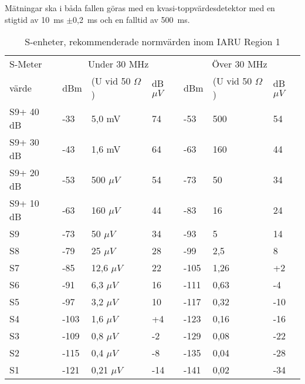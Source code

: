 Mätningar ska i båda fallen göras med en kvasi-toppvärdesdetektor
med en stigtid av 10~ms \(\pm\)0,2~ms och en falltid av 500~ms.

\begin{table}[h]
  \begin{tabular}{l|lll|lll}
    S-Meter  & \multicolumn{3}{c}{Under 30 MHz} & \multicolumn{3}{c}{Över 30 MHz} \\
    värde    & dBm & (U vid 50 \(\Omega\)) & dB\(\mu V\) & dBm & (U vid 50 \(\Omega\)) & dB\(\mu V\) \\
    \hline
    S9+ 40 dB & -33  & 5,0 mV  & 74  & -53  & 500  & 54  \\
    S9+ 30 dB & -43  & 1,6 mV  & 64  & -63  & 160  & 44  \\
    S9+ 20 dB & -53  & 500 \(\mu V\)  & 54  & -73  & 50   & 34  \\
    S9+ 10 dB & -63  & 160 \(\mu V\)  & 44  & -83  & 16   & 24  \\
    S9        & -73  & 50 \(\mu V\)   & 34  & -93  & 5    & 14  \\
    S8        & -79  & 25 \(\mu V\)   & 28  & -99  & 2,5  & 8   \\
    S7        & -85  & 12,6 \(\mu V\) & 22  & -105 & 1,26 & +2  \\
    S6        & -91  & 6,3 \(\mu V\)  & 16  & -111 & 0,63 & -4  \\
    S5        & -97  & 3,2 \(\mu V\)  & 10  & -117 & 0,32 & -10 \\
    S4        & -103 & 1,6 \(\mu V\)  & +4  & -123 & 0,16 & -16 \\
    S3        & -109 & 0,8 \(\mu V\)  & -2  & -129 & 0,08 & -22 \\
    S2        & -115 & 0,4 \(\mu V\)  & -8  & -135 & 0,04 & -28 \\
    S1        & -121 & 0,21 \(\mu V\) & -14 & -141 & 0,02 & -34 \\
  \end{tabular}
  \caption{S-enheter, rekommenderade normvärden inom IARU Region 1}
  \label{s-enhet tabell}
\end{table}
